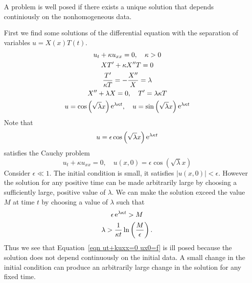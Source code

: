 {\begin{Solution}
  A problem is well posed if there exists a unique solution that depends 
  continiously on the nonhomogeneous data.

  First we find some solutions of the differential equation with the separation
  of variables $u = X(x) T(t)$.
  \begin{gather*}
    u_t + \kappa u_{x x} = 0, \quad \kappa > 0
    \\
    X T' + \kappa X'' T = 0
    \\
    \frac{T'}{\kappa T} = - \frac{X''}{X} = \lambda
    \\
    X'' + \lambda X = 0, \quad T' = \lambda \kappa T
    \\
    u = \cos\left( \sqrt{\lambda} x \right) \mathop{\mathrm{e}}\nolimits^{\lambda \kappa t}, \quad
    u = \sin\left( \sqrt{\lambda} x \right) \mathop{\mathrm{e}}\nolimits^{\lambda \kappa t}
  \end{gather*}
  Note that 
  \[
  u = \epsilon \cos\left( \sqrt{\lambda} x \right) \mathop{\mathrm{e}}\nolimits^{\lambda \kappa t}
  \]
  satisfies the Cauchy problem
  \[
  u_t + \kappa u_{x x} = 0, \quad u(x,0) = \epsilon \cos\left( \sqrt{\lambda} x \right)
  \]
  Consider $\epsilon \ll 1$.  The initial condition is small, it satisfies 
  $|u(x,0)| < \epsilon$.  However the solution for any positive time can be made 
  arbitrarily large by choosing a sufficiently large, positive value of $\lambda$.
  We can make the solution exceed the value $M$ at time $t$ by choosing 
  a value of $\lambda$ such that
  \begin{gather*}
    \epsilon \mathop{\mathrm{e}}\nolimits^{\lambda \kappa t} > M
    \\
    \lambda > \frac{1}{\kappa t} \ln \left( \frac{M}{\epsilon} \right).
  \end{gather*}
  Thus we see that Equation~\ref{eqn ut+kuxx=0 ux0=f} is ill posed because 
  the solution does not depend continuously on the initial data.  A small 
  change in the initial condition can produce an arbitrarily large change 
  in the solution for any fixed time.
\end{Solution}









}
